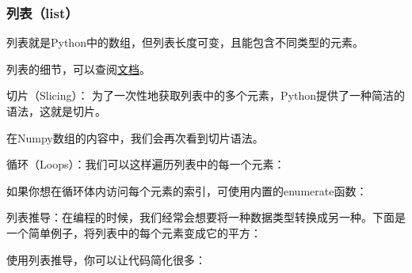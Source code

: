 \subsubsection{列表（list）}


列表就是Python中的数组，但列表长度可变，且能包含不同类型的元素。 

列表的细节，可以查阅\href{https://docs.python.org/3.5/tutorial/datastructures.html#more-on-lists}{文档}。


切片（Slicing）：
为了一次性地获取列表中的多个元素，Python提供了一种简洁的语法，这就是切片。




在Numpy数组的内容中，我们会再次看到切片语法。



循环（Loops）：我们可以这样遍历列表中的每一个元素：




如果你想在循环体内访问每个元素的索引，可使用内置的enumerate函数：





列表推导：在编程的时候，我们经常会想要将一种数据类型转换成另一种。下面是一个简单例子，将列表中的每个元素变成它的平方：





使用列表推导，你可以让代码简化很多：




